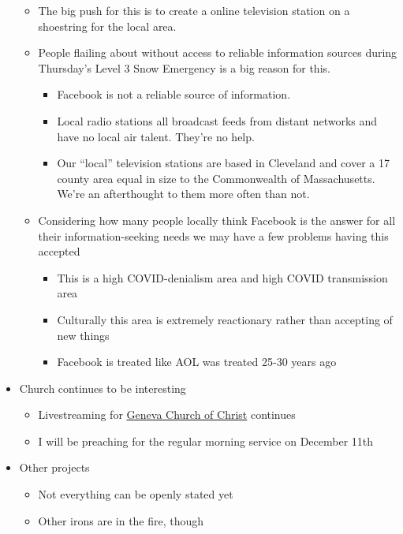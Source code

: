 \begin{itemize}
  \begin{itemize}
  \tightlist
  \item
    The big push for this is to create a online television station on a
    shoestring for the local area.
  \item
    People flailing about without access to reliable information sources
    during Thursday's Level 3 Snow Emergency is a big reason for this.

    \begin{itemize}
    \tightlist
    \item
      Facebook is not a reliable source of information.
    \item
      Local radio stations all broadcast feeds from distant networks and
      have no local air talent. They're no help.
    \item
      Our ``local'' television stations are based in Cleveland and cover
      a 17 county area equal in size to the Commonwealth of
      Massachusetts. We're an afterthought to them more often than not.
    \end{itemize}
  \item
    Considering how many people locally think Facebook is the answer for
    all their information-seeking needs we may have a few problems
    having this accepted

    \begin{itemize}
    \tightlist
    \item
      This is a high COVID-denialism area and high COVID transmission
      area
    \item
      Culturally this area is extremely reactionary rather than
      accepting of new things
    \item
      Facebook is treated like AOL was treated 25-30 years ago
    \end{itemize}
  \end{itemize}
\item
  Church continues to be interesting

  \begin{itemize}
  \tightlist
  \item
    Livestreaming for \href{https://genevachurchofchrist.org}{Geneva
    Church of Christ} continues
  \item
    I will be preaching for the regular morning service on December 11th
  \end{itemize}
\item
  Other projects

  \begin{itemize}
  \tightlist
  \item
    Not everything can be openly stated yet
  \item
    Other irons are in the fire, though
  \end{itemize}
\end{itemize}
